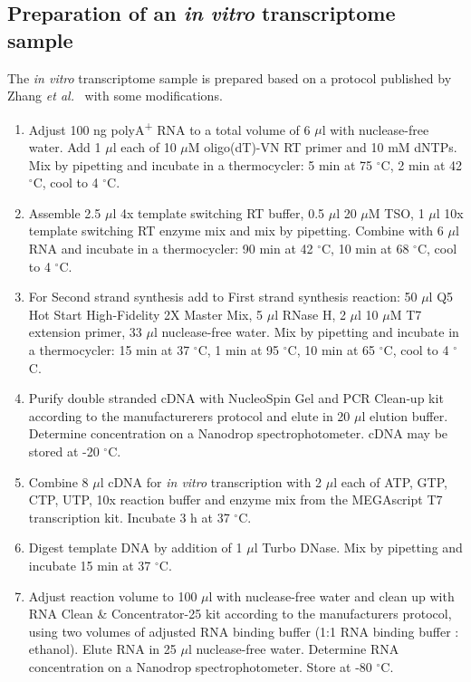 \documentclass[times, 11pt, a4paper]{article}
\begin{document}
\subsection*{Preparation of an \emph{in vitro} transcriptome sample}
The \emph{in vitro} transcriptome sample is prepared based on a protocol published by Zhang \emph{et al.}~\cite{zhang2021systematic} with some modifications.

\begin{enumerate}
\item Adjust 100 ng polyA\textsuperscript{+} RNA to a total volume of 6 $\mu$l with nuclease-free water. Add 1 $\mu$l each of 10 $\mu$M oligo(dT)-VN RT primer and 10 mM dNTPs. Mix by pipetting and incubate in a thermocycler: 5 min at 75 $^{\circ}$C, 2 min at 42 $^{\circ}$C, cool to 4 $^{\circ}$C.

\item Assemble 2.5 $\mu$l 4x template switching RT buffer, 0.5 $\mu$l 20 $\mu$M TSO, 1 $\mu$l 10x template switching RT enzyme mix and mix by pipetting. Combine with 6 $\mu$l RNA and incubate in a thermocycler: 90 min at 42 $^{\circ}$C, 10 min at 68 $^{\circ}$C, cool to 4 $^{\circ}$C.

\item For Second strand synthesis add to First strand synthesis reaction: 50 $\mu$l Q5 Hot Start High-Fidelity 2X Master Mix, 5 $\mu$l RNase H, 2 $\mu$l 10 $\mu$M T7 extension primer, 33 $\mu$l nuclease-free water. Mix by pipetting and incubate in a thermocycler: 15 min at 37 $^{\circ}$C, 1 min at 95 $^{\circ}$C, 10 min at 65 $^{\circ}$C, cool to 4 $^{\circ}$C.

\item Purify double stranded cDNA with NucleoSpin Gel and PCR Clean‑up kit according to the manufacturerers protocol and elute in 20 $\mu$l elution buffer. Determine concentration on a Nanodrop spectrophotometer. cDNA may be stored at -20 $^{\circ}$C.

\item Combine 8 $\mu$l cDNA for \emph{in vitro} transcription with 2 $\mu$l each of ATP, GTP, CTP, UTP, 10x reaction buffer and enzyme mix from the MEGAscript T7 transcription kit. Incubate 3 h at 37 $^{\circ}$C.

\item Digest template DNA by addition of 1 $\mu$l Turbo DNase. Mix by pipetting and incubate 15 min at 37 $^{\circ}$C.

\item Adjust reaction volume to 100 $\mu$l with nuclease-free water and clean up with RNA Clean \& Concentrator-25 kit according to the manufacturers protocol, using two volumes of adjusted RNA binding buffer (1:1 RNA binding buffer : ethanol). Elute RNA in 25 $\mu$l nuclease-free water. Determine RNA concentration on a Nanodrop spectrophotometer. Store at -80 $^{\circ}$C.

\end{enumerate}
\end{document}
